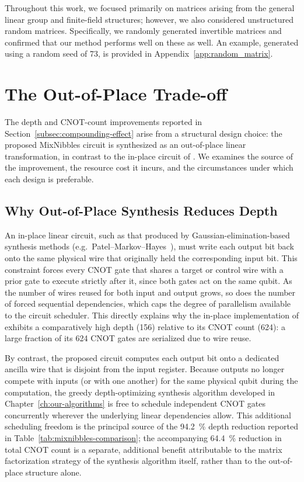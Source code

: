 Throughout this work, we focused primarily on matrices arising from the general linear group and finite-field structures; however, we also considered unstructured random matrices. Specifically, we randomly generated invertible matrices and confirmed that our method performs well on these as well. An example, generated using a random seed of 73, is provided in Appendix~\ref{app:random_matrix}.

\section{The Out-of-Place Trade-off}
\label{sec:out-of-place-tradeoff}

The depth and CNOT-count improvements reported in Section~\ref{subsec:compounding-effect} arise from a structural design choice: the proposed MixNibbles circuit is synthesized as an out-of-place linear transformation, in contrast to the in-place circuit of \cite{cryptoeprint:2026/1007}. We examines the source of the improvement, the resource cost it incurs, and the circumstances under which each design is preferable.

\subsection{Why Out-of-Place Synthesis Reduces Depth}

An in-place linear circuit, such as that produced by Gaussian-elimination-based synthesis methods (e.g.\ Patel--Markov--Hayes~\cite{markov2008optimal}), must write each output bit back onto the same physical wire that originally held the corresponding input bit. This constraint forces every CNOT gate that shares a target or control wire with a prior gate to execute strictly after it, since both gates act on the same qubit. As the number of wires reused for both input and output grows, so does the number of forced sequential dependencies, which caps the degree of parallelism available to the circuit scheduler. This directly explains why the in-place implementation of \cite{cryptoeprint:2026/1007} exhibits a comparatively high depth (\num{156}) relative to its CNOT count (\num{624}): a large fraction of its \num{624} CNOT gates are serialized due to wire reuse.

By contrast, the proposed circuit computes each output bit onto a dedicated ancilla wire that is disjoint from the input register. Because outputs no longer compete with inputs (or with one another) for the same physical qubit during the computation, the greedy depth-optimizing synthesis algorithm developed in Chapter~\ref{ch:our-algorithms} is free to schedule independent CNOT gates concurrently wherever the underlying linear dependencies allow. This additional scheduling freedom is the principal source of the \SI{94.2}{\percent} depth reduction reported in Table~\ref{tab:mixnibbles-comparison}; the accompanying \SI{64.4}{\percent} reduction in total CNOT count is a separate, additional benefit attributable to the matrix factorization strategy of the synthesis algorithm itself, rather than to the out-of-place structure alone.

